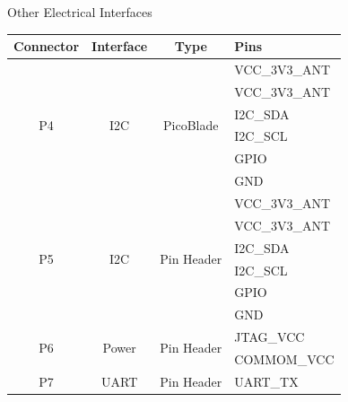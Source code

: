 \begin{frame}{Other Electrical Interfaces}

    \begin{table}[!htb]\tiny
        \centering
        \begin{tabular}{cccl}
            \toprule[1.5pt]
            \textbf{Connector} & \textbf{Interface} & \textbf{Type} & \textbf{Pins}\\
            \midrule
            \multirow{6}{*}{P4} & \multirow{6}{*}{I2C} & \multirow{6}{*}{PicoBlade}  & VCC\_3V3\_ANT \\
                                &                       &                             & VCC\_3V3\_ANT \\
                                &                       &                             & I2C\_SDA \\
                                &                       &                             & I2C\_SCL \\
                                &                       &                             & GPIO \\
                                &                       &                             & GND \\
            \midrule
            \multirow{6}{*}{P5} & \multirow{6}{*}{I2C} & \multirow{6}{*}{Pin Header} & VCC\_3V3\_ANT \\
                                &                       &                             & VCC\_3V3\_ANT \\
                                &                       &                             & I2C\_SDA \\
                                &                       &                             & I2C\_SCL \\
                                &                       &                             & GPIO \\
                                &                       &                             & GND \\
            \midrule
            \multirow{2}{*}{P6} & \multirow{2}{*}{Power} & \multirow{2}{*}{Pin Header} & JTAG\_VCC \\
                                &                       &                                    & COMMOM\_VCC \\
            \midrule
            \multirow{2}{*}{P7} & \multirow{2}{*}{UART} & \multirow{2}{*}{Pin Header} & UART\_TX \\

\end{tabular}
\end{table}
\end{frame}

